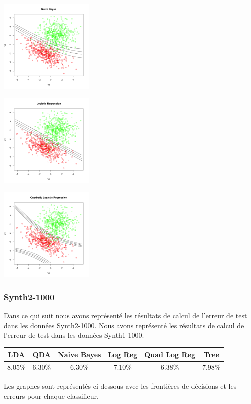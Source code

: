 \documentclass[10pt]{article}
\begin{document}
\begin{center}
	\includegraphics[width=45mm]{Figures/synth1_nb.png}
\end{center}
\begin{minipage}{.5\textwidth}
	\includegraphics[width=45mm]{Figures/synth1_logreg.png}
\end{minipage}%
\hspace{0.02\linewidth}
\begin{minipage}{.5\textwidth}
	\includegraphics[width=45mm]{Figures/synth1_logregquad.png}
\end{minipage}

\subsubsection{Synth2-1000}
Dans ce qui suit nous avons représenté les résultats de calcul de l'erreur de test dans les données Synth2-1000. 
Nous avons représenté les résultats de calcul de l'erreur de test dans les données Synth1-1000. 
\begin{center}
	\begin{tabular}{|c | c | c| c| c| c|}
		\hline
		LDA & QDA & Naive Bayes & Log Reg & Quad Log Reg & Tree\\
		\hline	
		8.05\% & 6.30\% & 6.30\% & 7.10\% & 6.38\% & 7.98\%
	\end{tabular}
\end{center}
Les graphes sont représentés ci-dessous avec les frontières de décisions et les erreurs pour chaque classifieur.
\end{document}
